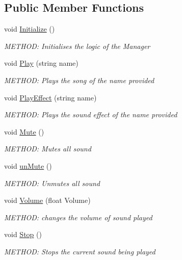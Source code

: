 \subsection*{Public Member Functions}
\begin{DoxyCompactItemize}
\item 
void \hyperlink{a00482_a02f14f3401f425a686a50e6b6a40aca7}{Initialize} ()
\begin{DoxyCompactList}\small\item\em M\+E\+T\+H\+OD\+: Initialises the logic of the Manager \end{DoxyCompactList}\item 
void \hyperlink{a00482_aec02346c5397b9b01b9d5d6baedc923e}{Play} (string name)
\begin{DoxyCompactList}\small\item\em M\+E\+T\+H\+OD\+: Plays the song of the name provided \end{DoxyCompactList}\item 
void \hyperlink{a00482_aa9e2fb77a5fe624ce65373f5ee8328ae}{Play\+Effect} (string name)
\begin{DoxyCompactList}\small\item\em M\+E\+T\+H\+OD\+: Plays the sound effect of the name provided \end{DoxyCompactList}\item 
void \hyperlink{a00482_a5bcad4d517b37a12b17e59d0b927ca37}{Mute} ()
\begin{DoxyCompactList}\small\item\em M\+E\+T\+H\+OD\+: Mutes all sound \end{DoxyCompactList}\item 
void \hyperlink{a00482_a59c011a4cf667d6e967bddad50c7cb2f}{un\+Mute} ()
\begin{DoxyCompactList}\small\item\em M\+E\+T\+H\+OD\+: Unmutes all sound \end{DoxyCompactList}\item 
void \hyperlink{a00482_ada3f38d5c50655b55f146ccdaf7c5967}{Volume} (float Volume)
\begin{DoxyCompactList}\small\item\em M\+E\+T\+H\+OD\+: changes the volume of sound played \end{DoxyCompactList}\item 
void \hyperlink{a00482_ac47a91d3e28a8f7a1e5348fb6eff50e2}{Stop} ()
\begin{DoxyCompactList}\small\item\em M\+E\+T\+H\+OD\+: Stops the current sound being played \end{DoxyCompactList}\item 

\end{DoxyCompactItemize}
